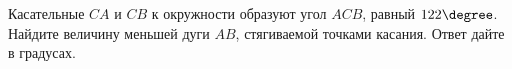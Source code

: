 \begin{ex}
	\begin{condition}
		 Касательные \( CA \)  и \( CB \) к окружности образуют угол \( ACB \), равный \( 122\degree\). Найдите величину меньшей дуги \( AB \), стягиваемой точками касания. Ответ дайте в градусах.
	\end{condition}
\end{ex}
